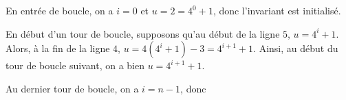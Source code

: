 \question{} En entrée de boucle, on a $i = 0$ et $u = 2 = 4^0+1$, donc l'invariant est initialisé. 

En début d'un tour de boucle, supposons qu'au début de la ligne $5$, $u = 4^i+1$. Alors, à la fin de la ligne $4$, $u = 4(4^i+1)-3 = 4^{i+1}+1$. 
Ainsi, au début du tour de boucle suivant, on a bien $u= 4^{i+1}+1$. 


Au dernier tour de boucle, on a $i=n-1$, donc 

